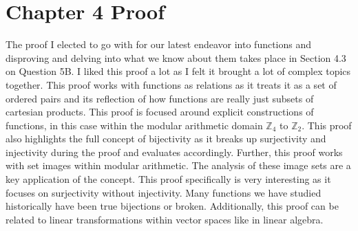 \documentclass{article}
\begin{document}
\section{Chapter 4 Proof}
\justifying
The proof I elected to go with for our latest endeavor into functions and disproving and delving into what we know about them takes place in Section 4.3 on Question 5B. I liked this proof a lot as I felt it brought a lot of complex topics together. This proof works with functions as relations as it treats it as a set of ordered pairs and its reflection of how functions are really just subsets of cartesian products. This proof is focused around explicit constructions of functions, in this case within the modular arithmetic domain $\mathbb{Z}_4$ to $\mathbb{Z}_2$. This proof also highlights the full concept of bijectivity as it breaks up surjectivity and injectivity during the proof and evaluates accordingly. Further, this proof works with set images within modular arithmetic. The analysis of these image sets are a key application of the concept. This proof specifically is very interesting as it focuses on surjectivity without injectivity. Many functions we have studied historically have been true bijections or broken. Additionally, this proof can be related to linear transformations within vector spaces like in linear algebra.

\begin{center}


\end{center}


\newpage
\end{document}
